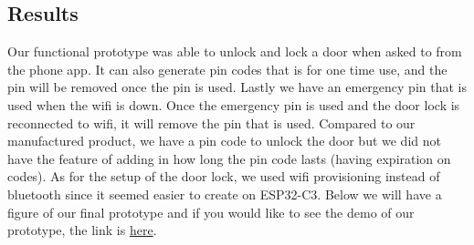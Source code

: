 \subsection{Results}

Our functional prototype was able to unlock and lock a door when asked to from the phone app. It can also generate pin codes that is for one time use, and the pin will be removed once the pin is used. Lastly we have an emergency pin that is used when the wifi is down. Once the emergency pin is used and the door lock is reconnected to wifi, it will remove the pin that is used. Compared to our manufactured product, we have a pin code to unlock the door but we did not have the feature of adding in how long the pin code lasts (having expiration on codes). As for the setup of the door lock, we used wifi provisioning instead of bluetooth since it seemed easier to create on ESP32-C3. Below we will have a figure of our final prototype and if you would like to see the demo of our prototype, the link is \href{https://youtu.be/XbD7zrFxasE?si=83Vg6o0KJSXbOtdF}{here}.
